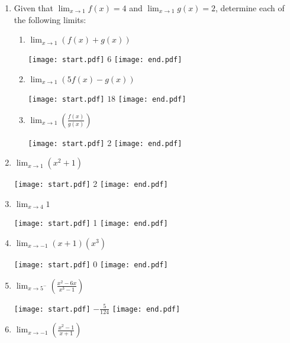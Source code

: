 \documentclass[12pt]{article}
\begin{document}
\begin{enumerate}

\item Given that $\displaystyle \lim_{x\rightarrow 1}{f(x)} = 4$ and  $\displaystyle \lim_{x\rightarrow 1}{g(x)}=2 $, determine each of the following limits:

\begin{enumerate}

\item $\displaystyle \lim_{x\rightarrow 1}{\left(f(x)+g(x)\right)}$

\texttt{[image: start.pdf]}
{{6}}
\texttt{[image: end.pdf]}


\item $\displaystyle \lim_{x\rightarrow 1}{\left(5f(x)-g(x)\right)}$

\texttt{[image: start.pdf]}
{{$18$}}
\texttt{[image: end.pdf]}


\item $\displaystyle \lim_{x\rightarrow 1}{\left(\frac{f(x)}{g(x)}\right)}$

\texttt{[image: start.pdf]}
{{2}}
\texttt{[image: end.pdf]}


\end{enumerate}

\item  $\displaystyle \lim_{x\rightarrow 1}{\left(x^2+1\right)}$

\texttt{[image: start.pdf]}
{{2}}
\texttt{[image: end.pdf]}


\item  $\displaystyle \lim_{x\rightarrow 4}{1}$

\texttt{[image: start.pdf]}
{{1}}
\texttt{[image: end.pdf]}


\item $\displaystyle \lim_{x\rightarrow -1}{(x+1)(x^3)}$

\texttt{[image: start.pdf]}
{{0}}
\texttt{[image: end.pdf]}


\item  $\displaystyle \lim_{x\rightarrow 5^-}{\left(\frac{x^2-6x}{x^3-1}\right)}$

\texttt{[image: start.pdf]}
{{$\displaystyle -\frac{5}{124}$}}
\texttt{[image: end.pdf]}


\item $\displaystyle \lim_{x\rightarrow -1}{\left(\frac{x^2-1}{x+1}\right)}$ 


\end{enumerate}
\end{document}
